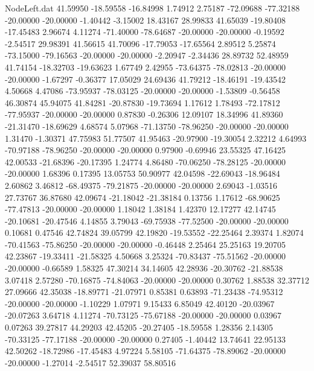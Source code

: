 \begin{filecontents}{NodeLeft.dat}
  41.59950  -18.59558  -16.84998     1.74912    2.75187  -72.09688  -77.32188  -20.00000  -20.00000   -1.40442   -3.15002   18.43167   28.99833
  41.65039  -19.80408  -17.45483     2.96674    4.11274  -71.40000  -78.64687  -20.00000  -20.00000   -0.19592   -2.54517   29.98391   41.56615
  41.70096  -17.79053  -17.65564     2.89512    5.25874  -73.15000  -79.16563  -20.00000  -20.00000   -2.20947   -2.34436   28.89732   52.48959
  41.74154  -18.32703  -19.63623     1.67749    2.42955  -73.64375  -78.02813  -20.00000  -20.00000   -1.67297   -0.36377   17.05029   24.69436
  41.79212  -18.46191  -19.43542     4.50668    4.47086  -73.95937  -78.03125  -20.00000  -20.00000   -1.53809   -0.56458   46.30874   45.94075
  41.84281  -20.87830  -19.73694     1.17612    1.78493  -72.17812  -77.95937  -20.00000  -20.00000    0.87830   -0.26306   12.09107   18.34996
  41.89360  -21.31470  -18.69629     4.68574    5.07968  -71.13750  -78.96250  -20.00000  -20.00000    1.31470   -1.30371   47.75983   51.77507
  41.95463  -20.97900  -19.30054     2.32212    4.64993  -70.97188  -78.96250  -20.00000  -20.00000    0.97900   -0.69946   23.55325   47.16425
  42.00533  -21.68396  -20.17395     1.24774    4.86480  -70.06250  -78.28125  -20.00000  -20.00000    1.68396    0.17395   13.05753   50.90977
  42.04598  -22.69043  -18.96484     2.60862    3.46812  -68.49375  -79.21875  -20.00000  -20.00000    2.69043   -1.03516   27.73767   36.87680
  42.09674  -21.18042  -21.38184     0.13756    1.17612  -68.90625  -77.47813  -20.00000  -20.00000    1.18042    1.38184    1.42370   12.17277
  42.14745  -20.10681  -20.47546     4.14855    3.79043  -69.75938  -77.52500  -20.00000  -20.00000    0.10681    0.47546   42.74824   39.05799
  42.19820  -19.53552  -22.25464     2.39374    1.82074  -70.41563  -75.86250  -20.00000  -20.00000   -0.46448    2.25464   25.25163   19.20705
  42.23867  -19.33411  -21.58325     4.50668    3.25324  -70.83437  -75.51562  -20.00000  -20.00000   -0.66589    1.58325   47.30214   34.14605
  42.28936  -20.30762  -21.88538     3.07418    2.57280  -70.16875  -74.84063  -20.00000  -20.00000    0.30762    1.88538   32.37712   27.09666
  42.35038  -18.89771  -21.07971     0.85381    0.63893  -71.23438  -74.95312  -20.00000  -20.00000   -1.10229    1.07971    9.15433    6.85049
  42.40120  -20.03967  -20.07263     3.64718    4.11274  -70.73125  -75.67188  -20.00000  -20.00000    0.03967    0.07263   39.27817   44.29203
  42.45205  -20.27405  -18.59558     1.28356    2.14305  -70.33125  -77.17188  -20.00000  -20.00000    0.27405   -1.40442   13.74641   22.95133
  42.50262  -18.72986  -17.45483     4.97224    5.58105  -71.64375  -78.89062  -20.00000  -20.00000   -1.27014   -2.54517   52.39037   58.80516

\end{filecontents}
